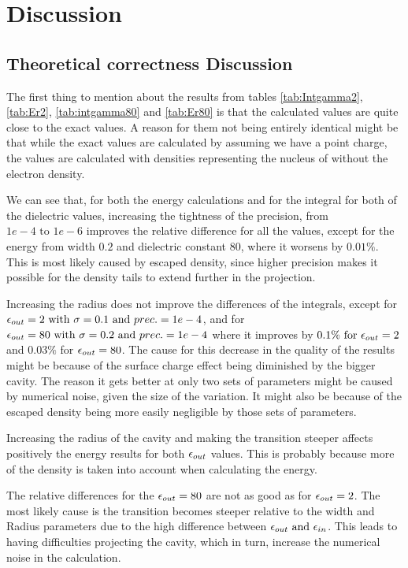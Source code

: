 \documentclass[../master_thesis.tex]{subfiles}
\begin{document}
\section{Discussion}
\subsection{Theoretical correctness Discussion}
The first thing to mention about the results from tables \ref{tab:Intgamma2}, \ref{tab:Er2},
\ref{tab:intgamma80} and \ref{tab:Er80} is that the calculated values are quite close
to the exact values. A reason for them not being entirely identical might be that while the
exact values are calculated by assuming we have a point charge, the \mrchem values
are calculated with densities representing the nucleus of  without the
electron density.

We can see that, for both the energy calculations and for the integral for both of the dielectric values,
increasing the tightness of the precision, from $1e-4 \text{ to } 1e-6$ improves the relative
difference for all the values, except for the energy from width $0.2$ and dielectric constant $80$, where
it worsens by $ 0.01\% $. This is most likely caused by escaped density, since higher precision makes
it possible for the density tails to extend further in the projection.

Increasing the radius does not improve the differences of the integrals, except for
$\epsilon_{out} = 2 \text{ with } \sigma = 0.1 \text{ and } prec. = 1e-4$, and for
$\epsilon_{out} = 80 \text{ with } \sigma = 0.2 \text{ and } prec. = 1e-4$ where it improves by
$0.1\% \text{ for } \epsilon_{out} = 2$ and $0.03\%$ for $\epsilon_{out} = 80$. The cause for
this decrease in the quality of the \mrchem results might be because of the surface
charge effect being diminished by the bigger cavity. The reason it gets better at
only two sets of parameters might be caused by numerical noise, given the size of
the variation. It might also be because of the escaped density being more easily
negligible by those sets of parameters.

Increasing the radius of the cavity and making the transition steeper affects
positively the energy results for both $\epsilon_{out}$ values. This is probably because
more of the density is taken into account when calculating the energy.

The relative differences for the $\epsilon_{out} = 80$ are not as good as for $\epsilon_{out} = 2$.
The most likely cause is the transition becomes steeper relative
to the width and Radius parameters due to the high difference between $\epsilon_{out} \text{ and } \epsilon_{in}$.
This leads to \mrchem having difficulties projecting the cavity, which in turn,
increase the numerical noise in the calculation.
\end{document}
